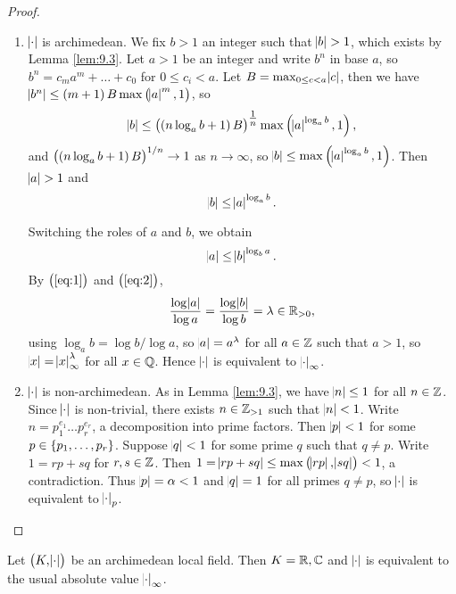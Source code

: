 \begin{proof}
\hfill
\begin{enumerate}[leftmargin=0.5in, label=Case \arabic*.]
\item $ \abs{\cdot} $ is archimedean. We fix $ b > 1 $ an integer such that $ \abs{b} > 1 $, which exists by Lemma \ref{lem:9.3}. Let $ a > 1 $ be an integer and write $ b^n $ in base $ a $, so $ b^n = c_ma^m + \dots + c_0 $ for $ 0 \le c_i < a $. Let $ B = \max_{0 \le c < a} \abs{c} $, then we have $ \abs{b^n} \le \br{m + 1}B\max\br{\abs{a}^m, 1} $, so
$$ \abs{b} \le \br{\br{n\log_a b + 1}B}^{\tfrac{1}{n}}\max\br{\abs{a}^{\log_a b}, 1}, $$
and $ \br{\br{n\log_a b + 1}B}^{1 / n} \to 1 $ as $ n \to \infty $, so $ \abs{b} \le \max\br{\abs{a}^{\log_a b}, 1} $. Then $ \abs{a} > 1 $ and
\begin{equation}
\label{eq:1}
\abs{b} \le \abs{a}^{\log_a b}.
\end{equation}

\pagebreak

Switching the roles of $ a $ and $ b $, we obtain
\begin{equation}
\label{eq:2}
\abs{a} \le \abs{b}^{\log_b a}.
\end{equation}
By $ \br{\ref{eq:1}} $ and $ \br{\ref{eq:2}} $,
$$ \dfrac{\log \abs{a}}{\log a} = \dfrac{\log \abs{b}}{\log b} = \lambda \in \mathbb{R}_{> 0}, $$
using $ \log_a b = \log b / \log a $, so $ \abs{a} = a^\lambda $ for all $ a \in \mathbb{Z} $ such that $ a > 1 $, so $ \abs{x} = \abs{x}_\infty^\lambda $ for all $ x \in \mathbb{Q} $. Hence $ \abs{\cdot} $ is equivalent to $ \abs{\cdot}_\infty $.
\item $ \abs{\cdot} $ is non-archimedean. As in Lemma \ref{lem:9.3}, we have $ \abs{n} \le 1 $ for all $ n \in \mathbb{Z} $. Since $ \abs{\cdot} $ is non-trivial, there exists $ n \in \mathbb{Z}_{> 1} $ such that $ \abs{n} < 1 $. Write $ n = p_1^{e_1} \dots p_r^{e_r} $, a decomposition into prime factors. Then $ \abs{p} < 1 $ for some $ p \in \cbr{p_1, \dots, p_r} $. Suppose $ \abs{q} < 1 $ for some prime $ q $ such that $ q \ne p $. Write $ 1 = rp + sq $ for $ r, s \in \mathbb{Z} $. Then $ 1 = \abs{rp + sq} \le \max\br{\abs{rp}, \abs{sq}} < 1 $, a contradiction. Thus $ \abs{p} = \alpha < 1 $ and $ \abs{q} = 1 $ for all primes $ q \ne p $, so $ \abs{\cdot} $ is equivalent to $ \abs{\cdot}_p $.
\end{enumerate}
\end{proof}

\begin{theorem}
\label{thm:9.6}
Let $ \br{K, \abs{\cdot}} $ be an archimedean local field. Then $ K = \mathbb{R}, \mathbb{C} $ and $ \abs{\cdot} $ is equivalent to the usual absolute value $ \abs{\cdot}_\infty $.
\end{theorem}

